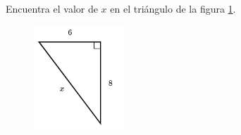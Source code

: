 \question[15]  Encuentra el valor de $x$ en el triángulo de la figura \ref{fig:lados_pitagoras_02}.
\begin{figure}[H]
    \begin{center}
        \includegraphics[width=0.3\textwidth]{../images/lados_pitagoras_02.png}
    \end{center}
    \caption{}
    \label{fig:lados_pitagoras_02}
\end{figure}